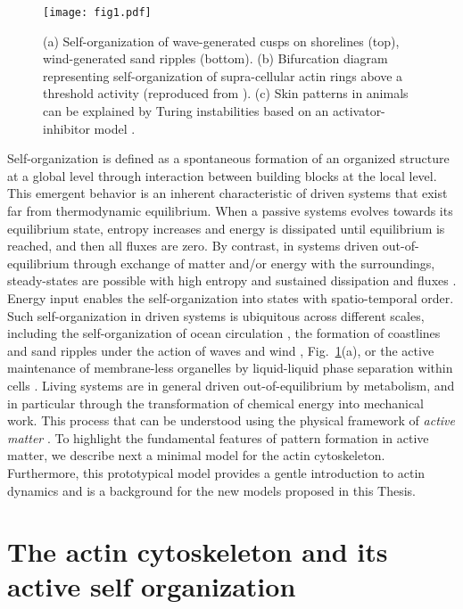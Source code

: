 \begin{figure}
	\centering
	\texttt{[image: fig1.pdf]}
		\caption{\label{fig_1_1} (a) Self-organization of wave-generated cusps on shorelines  \cite{coco2007} (top),  wind-generated  sand ripples \cite{anderson1990} (bottom).  (b)  Bifurcation diagram representing self-organization of supra-cellular actin rings above a threshold activity (reproduced from \cite{hannezo2015}). (c)  Skin patterns in animals can be explained by Turing instabilities based on an activator-inhibitor model \cite{turing1952}.}
\end{figure}

Self-organization is defined as a spontaneous formation of an organized structure at a global level through interaction between building blocks at the local level. This emergent behavior is an inherent characteristic of driven systems that exist far from thermodynamic equilibrium. %
When a passive systems evolves towards its equilibrium state, entropy increases and energy is dissipated until equilibrium is reached, and then all fluxes are zero. By contrast, in  systems driven out-of-equilibrium through exchange of matter and/or energy with the surroundings, steady-states are possible with high entropy and sustained dissipation and fluxes \cite{chung2022,prigogine1963,nicolis1977}.  Energy input enables the self-organization into states with spatio-temporal order. Such self-organization in driven systems is ubiquitous across different scales, including the self-organization of ocean circulation \cite{Michael2017}, the formation of  coastlines and sand ripples under the action of waves and wind \cite{coco2007,anderson1990}, Fig.~\ref{fig_1_1}(a), or the active maintenance of membrane-less organelles by liquid-liquid phase separation within cells \cite{hyman2014}. Living systems are in general driven out-of-equilibrium by metabolism, and in particular through the transformation of chemical energy into mechanical work. This process that can be understood using the physical framework of \emph{active matter} \cite{marchetti2013}. To highlight the fundamental features of pattern formation in active matter, we describe next a minimal model for the actin cytoskeleton. Furthermore, this prototypical model provides a gentle introduction to actin dynamics and is a background for the new models proposed in this Thesis.

\section{The actin cytoskeleton and its active self organization}

